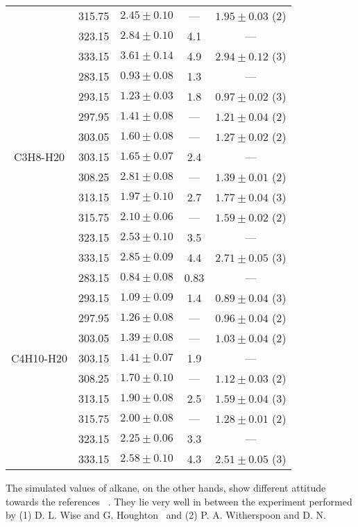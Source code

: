 \begin{table}[H]
{\begin{tabular}{|c| c| c| c| c| }
  & 315.75 & $2.45 \pm 0.10$ & --- & $1.95 \pm 0.03$ (2)   \\
  & 323.15 & $2.84 \pm 0.10$ & 4.1 & ---    \\
  & 333.15 & $3.61 \pm 0.14$ & 4.9 & $2.94 \pm 0.12$ (3)  \\
  \hline & 283.15 & $0.93 \pm 0.08$ & 1.3 & --- \\
  & 293.15 &  $1.23 \pm 0.03$& 1.8 & $0.97 \pm 0.02$ (3)    \\
  & 297.95 &  $1.41 \pm 0.08$ & --- &  $1.21 \pm 0.04$ (2)  \\
  & 303.05 & $1.60 \pm 0.08$ & --- &  $1.27 \pm 0.02$ (2)    \\
 C3H8-H20 & 303.15 &$1.65 \pm 0.07$ & 2.4 & ---    \\
  & 308.25 & $2.81 \pm 0.08$ & --- &  $1.39 \pm 0.01$ (2)   \\
  & 313.15 & $1.97 \pm 0.10$ & 2.7 & $1.77 \pm 0.04$ (3)    \\
  & 315.75 &  $2.10 \pm 0.06$ & --- &  $1.59 \pm 0.02$ (2)    \\
  & 323.15 & $2.53\pm 0.10$ & 3.5 & ---    \\
  & 333.15 & $2.85 \pm 0.09$ & 4.4 & $2.71 \pm 0.05$ (3)   \\
  \hline
  & 283.15 &  $0.84 \pm 0.08$ & 0.83 & ---    \\
  & 293.15 &  $1.09 \pm 0.09$ & 1.4 & $0.89 \pm 0.04$ (3) \\
  & 297.95 & $1.26 \pm 0.08$ & --- &  $0.96 \pm 0.04$ (2)    \\
  & 303.05 &  $1.39 \pm 0.08$& --- &  $1.03 \pm 0.04$   (2) \\
 C4H10-H20 & 303.15 & $1.41 \pm 0.07$& 1.9 & --- \\
  & 308.25 &  $1.70 \pm 0.10$ & ---&   $1.12 \pm 0.03$   (2) \\
  & 313.15 & $1.90 \pm 0.08$ & 2.5 & $1.59 \pm 0.04$ (3) \\
  & 315.75 & $2.00 \pm 0.08$ & --- &  $1.28 \pm 0.01$ (2)  \\
  & 323.15 & $2.25 \pm 0.06$ & 3.3 & ---    \\
  & 333.15 &  $2.58 \pm 0.10$ & 4.3 & $2.51 \pm 0.05$ (3)  \\
 \hline 
 \end{tabular}}
 \end{table} 
 The simulated values of alkane, on the other hands, show different attitude towards the references~ \citep{wise1966diffusion, witherspoon1965diffusion, witherspoon1969correlation, michalis2016molecular}. They lie very well in between the experiment performed by (1) D. L. Wise and G. Houghton~\citep{wise1966diffusion} and (2) P. A. Witherspoon and D. N.
